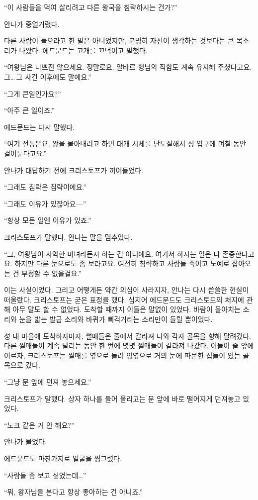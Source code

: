 ``이 사람들을 먹여 살리려고 다른 왕국을 침략하시는 건가?''

안나가 중얼거렸다.

다른 사람이 들으라고 한 말은 아니었지만, 분명히 자신이 생각하는 것보다는 큰 목소리가 나왔다. 에드문드는 고개를 끄덕이고 말했다.

``여왕님은 나쁘진 않으세요. 정말로요. 알바르 형님의 직함도 계속 유지해 주셨다고요. 그\ldots\,그 사건 이후에도 말예요.''

``그게 큰일인가요?''

``아주 큰 일이죠.''

에드문드는 다시 말했다.

``여기 전통은요, 왕을 몰아내려고 하면 대개 시체를 난도질해서 성 입구에 며칠 동안 걸어둔다고요.''

안나가 대답하기 전에 크리스토프가 끼어들었다.

``그래도 침략은 침략이에요.''

``그래도 이유가 있잖아요—''

``항상 모든 일엔 이유가 있죠.''

크리스토프가 말했다. 안나는 말을 멈추었다.

``그, 여왕님이 사악한 마녀라든지 하는 건 아니에요. 여기서 하시는 일은 다 존중한다고요. 하지만 다른 눈으로도 좀 보라고요. 여전히 침략하고 사람들 죽이고 노예로 잡아오는 건 부정할 수 없을걸요.''

이는 사실이었다. 그리고 어떻게든 약간 의심이 사라지자, 안나는 다시 씁쓸한 현실이 떠올랐다. 크리스토프는 굳은 표정을 했다. 심지어 에드문드도 크리스토프의 처지에 관해 아무 말도 할 수 없었다. 도착할 때까지 이들은 말없이 있었다. 바람이 몰아치는 소리와 눈을 밟는 발굽 소리와 바퀴가 삐걱거리는 소리만이 들릴 뿐이었다.

성 내 마을에 도착하자마자, 썰매들은 줄에서 갈라져 나와 각자 골목을 향해 달려갔다. 다른 썰매들이 계속 달리는 동안 한 번에 몇몇 썰매들이 갈라져 나갔다. 이들이 줄 앞에 이르자, 크리스토프는 썰매를 옆으로 돌려 양옆으로 거의 눈에 파묻힌 집들이 있는 골목으로 갔다.

``그냥 문 앞에 던져 놓으세요.''

크리스토프가 말했다. 상자 하나를 들어 올리고는 문 앞에 바로 떨어지게 던져놓고 있었다.

``노크 같은 거 안 해요?''

안나가 물었다.

에드문드도 마찬가지로 얼굴을 찡그렸다.

``사람들 좀 보고 싶었는데\ldots''

``뭐, 왕자님을 본다고 항상 좋아하는 건 아니죠.''

